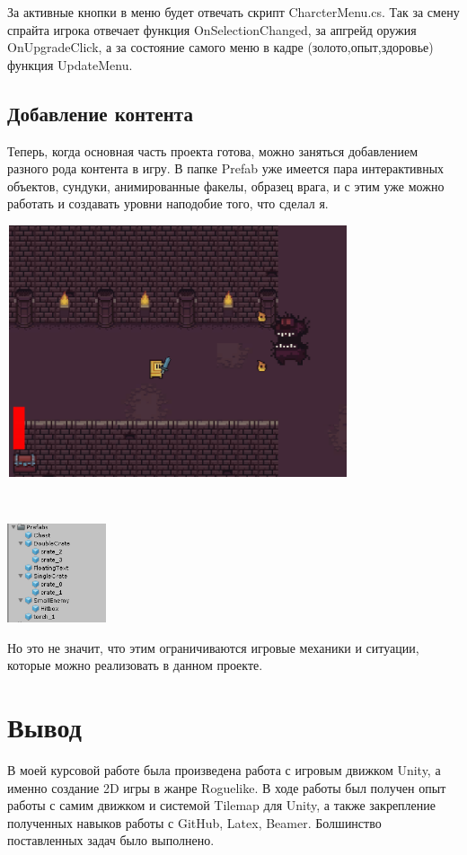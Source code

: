 \documentclass[a4paper,12pt]{article}
\begin{document}
За активные кнопки в меню будет отвечать скрипт CharcterMenu.cs. Так за смену спрайта игрока отвечает функция OnSelectionChanged, за апгрейд оружия OnUpgradeClick, а за состояние самого меню в кадре (золото,опыт,здоровье) функция UpdateMenu.

\newpage
\subsection{Добавление контента}
Теперь, когда основная часть проекта готова, можно заняться добавлением разного рода контента в игру. В папке Prefab уже имеется пара интерактивных объектов, сундуки, анимированные факелы, образец врага, и с этим уже можно работать и создавать уровни наподобие того, что сделал я. \\
\centerline{\includegraphics[width = 380px, height=280px]{pictures/boss.png}}\\
\centerline{\includegraphics[width = 110px, height=110px]{pictures/prefab.png}}

Но это не значит, что этим ограничиваются игровые механики и ситуации, которые можно реализовать в данном проекте.

\newpage
\section{Вывод}
\Large
В моей курсовой работе была произведена работа с игровым движком Unity, а именно создание 2D игры в жанре Roguelike. В ходе работы был получен опыт работы с самим движком и системой Tilemap для Unity, а также закрепление полученных навыков работы с GitHub, Latex, Beamer.
Болшинство поставленных задач было выполнено.
\end{document}
